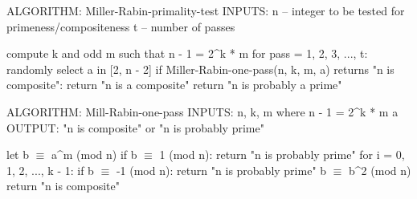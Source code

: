 \newcommand\mathmode[1]{$ #1 $}
\begin{smallconsole}[commandchars=\\\{\}]
ALGORITHM: Miller-Rabin-primality-test
INPUTS: n -- integer to be tested for primeness/compositeness
        t -- number of passes

compute k and odd m such that n - 1 = 2^k * m
for pass = 1, 2, 3, ..., t:
    randomly select a in [2, n - 2]
    if Miller-Rabin-one-pass(n, k, m, a) returns "n is composite":
        return "n is a composite"
return "n is probably a prime"


ALGORITHM: Mill-Rabin-one-pass
INPUTS: n, k, m where n - 1 = 2^k * m
        a
OUTPUT: "n is composite" or "n is probably prime"
       
let b \mathmode{\equiv} a^m (mod n)
if b \mathmode{\equiv} 1 (mod n):
    return "n is probably prime"
for i = 0, 1, 2, ..., k - 1:
    if b \mathmode{\equiv} -1 (mod n):
        return "n is probably prime"
    b \mathmode{\equiv} b^2 (mod n)
return "n is composite"
\end{smallconsole}







